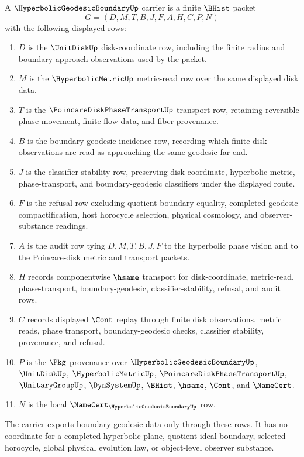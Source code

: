 \begin{definition}
\label{def:hyperbolic-geodesic-boundary-carrier}
A $\HyperbolicGeodesicBoundaryUp$ carrier is a finite $\BHist$ packet
$$
G=(D,M,T,B,J,F,A,H,C,P,N)
$$
with the following displayed rows:
\begin{enumerate}
\item $D$ is the $\UnitDiskUp$ disk-coordinate row, including the finite radius and boundary-approach observations used by the packet.
\item $M$ is the $\HyperbolicMetricUp$ metric-read row over the same displayed disk data.
\item $T$ is the $\PoincareDiskPhaseTransportUp$ transport row, retaining reversible phase movement, finite flow data, and fiber provenance.
\item $B$ is the boundary-geodesic incidence row, recording which finite disk observations are read as approaching the same geodesic far-end.
\item $J$ is the classifier-stability row, preserving disk-coordinate, hyperbolic-metric, phase-transport, and boundary-geodesic classifiers under the displayed route.
\item $F$ is the refusal row excluding quotient boundary equality, completed geodesic compactification, host horocycle selection, physical cosmology, and observer-substance readings.
\item $A$ is the audit row tying $D,M,T,B,J,F$ to the hyperbolic phase vision and to the Poincare-disk metric and transport packets.
\item $H$ records componentwise $\hsame$ transport for disk-coordinate, metric-read, phase-transport, boundary-geodesic, classifier-stability, refusal, and audit rows.
\item $C$ records displayed $\Cont$ replay through finite disk observations, metric reads, phase transport, boundary-geodesic checks, classifier stability, provenance, and refusal.
\item $P$ is the $\Pkg$ provenance over $\HyperbolicGeodesicBoundaryUp$, $\UnitDiskUp$, $\HyperbolicMetricUp$, $\PoincareDiskPhaseTransportUp$, $\UnitaryGroupUp$, $\DynSystemUp$, $\BHist$, $\hsame$, $\Cont$, and $\NameCert$.
\item $N$ is the local $\NameCert_{\HyperbolicGeodesicBoundaryUp}$ row.
\end{enumerate}
The carrier exports boundary-geodesic data only through these rows. It has no coordinate for a completed hyperbolic plane, quotient ideal boundary, selected horocycle, global physical evolution law, or object-level observer substance.
\end{definition}


